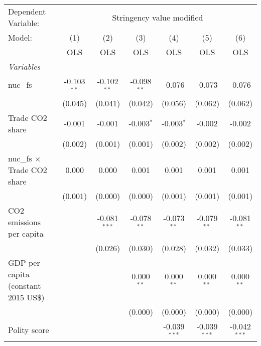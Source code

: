 
\begingroup
\centering
\begin{tabular}{lcccccc}
   \toprule
   Dependent Variable: & \multicolumn{6}{c}{Stringency value modified}\\
   Model:                               & (1)           & (2)            & (3)           & (4)            & (5)            & (6)\\  
                                        &  OLS          & OLS            & OLS           & OLS            & OLS            & OLS\\  
   \midrule
   \emph{Variables}\\
   nuc\_fs                              & -0.103$^{**}$ & -0.102$^{**}$  & -0.098$^{**}$ & -0.076         & -0.073         & -0.076\\   
                                        & (0.045)       & (0.041)        & (0.042)       & (0.056)        & (0.062)        & (0.062)\\   
   Trade CO2 share                      & -0.001        & -0.001         & -0.003$^{*}$  & -0.003$^{*}$   & -0.002         & -0.002\\   
                                        & (0.002)       & (0.001)        & (0.001)       & (0.002)        & (0.002)        & (0.002)\\   
   nuc\_fs $\times$ Trade CO2 share     & 0.000         & 0.000          & 0.001         & 0.001          & 0.001          & 0.001\\   
                                        & (0.001)       & (0.000)        & (0.000)       & (0.001)        & (0.001)        & (0.001)\\   
   CO2 emissions per capita             &               & -0.081$^{***}$ & -0.078$^{**}$ & -0.073$^{**}$  & -0.079$^{**}$  & -0.081$^{**}$\\   
                                        &               & (0.026)        & (0.030)       & (0.028)        & (0.032)        & (0.033)\\   
   GDP per capita (constant 2015 US\$)  &               &                & 0.000$^{**}$  & 0.000$^{**}$   & 0.000$^{**}$   & 0.000$^{**}$\\   
                                        &               &                & (0.000)       & (0.000)        & (0.000)        & (0.000)\\   
   Polity score                         &               &                &               & -0.039$^{***}$ & -0.039$^{***}$ & -0.042$^{***}$\\   

\end{tabular}

